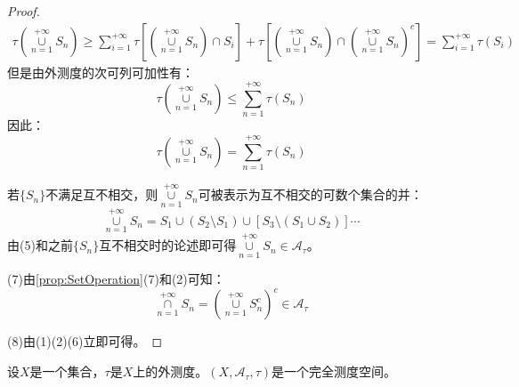 \begin{proof}
	\begin{align*}
		\tau\left(\underset{n=1}{\overset{+\infty}{\cup}}S_n\right)\geqslant\sum_{i=1}^{+\infty}\tau\left[\left(\underset{n=1}{\overset{+\infty}{\cup}}S_n\right)\cap S_i\right]+\tau\left[\left(\underset{n=1}{\overset{+\infty}{\cup}}S_n\right)\cap\left(\underset{n=1}{\overset{+\infty}{\cup}}S_n\right)^c\right]=\sum_{i=1}^{+\infty} \tau(S_i)
	\end{align*}
	但是由外测度的次可列可加性有：
	\begin{equation*}
		\tau\left(\underset{n=1}{\overset{+\infty}{\cup}}S_n\right)\leqslant\sum_{n=1}^{+\infty} \tau(S_n)
	\end{equation*}
	因此：
	\begin{equation*}
		\tau\left(\underset{n=1}{\overset{+\infty}{\cup}}S_n\right)=\sum_{n=1}^{+\infty} \tau(S_n)
	\end{equation*}\par
	若$\{S_n\}$不满足互不相交，则$\underset{n=1}{\overset{+\infty}{\cup}}S_n$可被表示为互不相交的可数个集合的并：
	\begin{equation*}
		\underset{n=1}{\overset{+\infty}{\cup}}S_n=S_1\cup (S_2\setminus S_1)\cup[S_3\setminus(S_1\cup S_2)]\cdots
	\end{equation*}
	由(5)和之前$\{S_n\}$互不相交时的论述即可得$\underset{n=1}{\overset{+\infty}{\cup}}S_n\in\mathscr{A}_{\tau}$。\par
	(7)由\cref{prop:SetOperation}(7)和(2)可知：
	\begin{equation*}
		\underset{n=1}{\overset{+\infty}{\cap}}S_n=\left(\underset{n=1}{\overset{+\infty}{\cup}}S_n^c\right)^c\in\mathscr{A}_{\tau}
	\end{equation*}\par
	(8)由(1)(2)(6)立即可得。
\end{proof}
\begin{theorem}\label{theo:ExteriorMeasureCompleteSpace}
	设$X$是一个集合，$\tau$是$X$上的外测度。$(X,\mathscr{A}_{\tau},\tau)$是一个完全测度空间。
\end{theorem}
